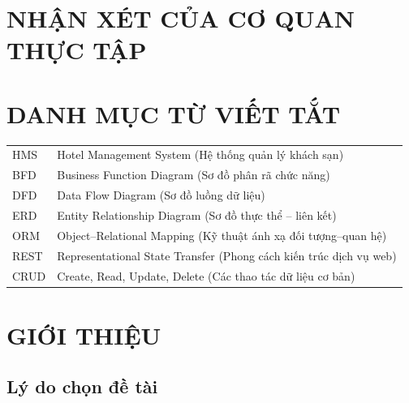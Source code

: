 \documentclass[13pt,a4paper]{extreport}
\begin{document}
\chapter*{NHẬN XÉT CỦA CƠ QUAN THỰC TẬP}


\tableofcontents
{}
\clearpage

\listoftables
{}
\clearpage

\listoffigures
{}
\clearpage

\chapter*{DANH MỤC TỪ VIẾT TẮT}

\begin{longtable}{p{3cm}p{10cm}}
  HMS   & Hotel Management System (Hệ thống quản lý khách sạn)\\
  BFD   & Business Function Diagram (Sơ đồ phân rã chức năng)\\
  DFD   & Data Flow Diagram (Sơ đồ luồng dữ liệu)\\
  ERD   & Entity Relationship Diagram (Sơ đồ thực thể -- liên kết)\\
  ORM   & Object--Relational Mapping (Kỹ thuật ánh xạ đối tượng--quan hệ)\\
  REST  & Representational State Transfer (Phong cách kiến trúc dịch vụ web)\\
  CRUD  & Create, Read, Update, Delete (Các thao tác dữ liệu cơ bản)\\
\end{longtable}

\clearpage
{}

\chapter{GIỚI THIỆU}

\section{Lý do chọn đề tài}
\end{document}
